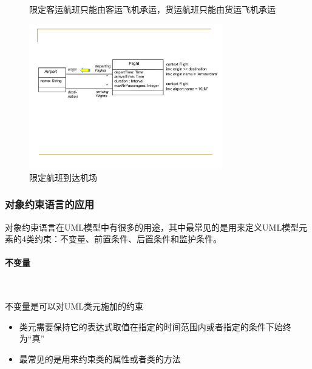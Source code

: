 \begin{figure}[H]
{\begin{minipage}[t]{0.48\linewidth}
		\end{minipage}
	}
    \caption*{限定客运航班只能由客运飞机承运，货运航班只能由货运飞机承运}
	\centering
	\vspace{-1em}
\end{figure}

\begin{figure}[H]
    \centering
    \vspace{-0.2em}
	\includegraphics[width=0.75\textwidth]{img/对象约束语言示例3.pdf}
    \caption*{限定航班到达机场}
    \vspace{-1em}
\end{figure}

\subsubsection{对象约束语言的应用}
对象约束语言在UML模型中有很多的用途，其中最常见的是用来定义UML模型元素的4类约束：不变量、前置条件、后置条件和监护条件。

\paragraph*{不变量}~{} \par
不变量是可以对UML类元施加的约束
\begin{itemize}
    \item 类元需要保持它的表达式取值在指定的时间范围内或者指定的条件下始终为“真”
    \item 最常见的是用来约束类的属性或者类的方法
\end{itemize}

